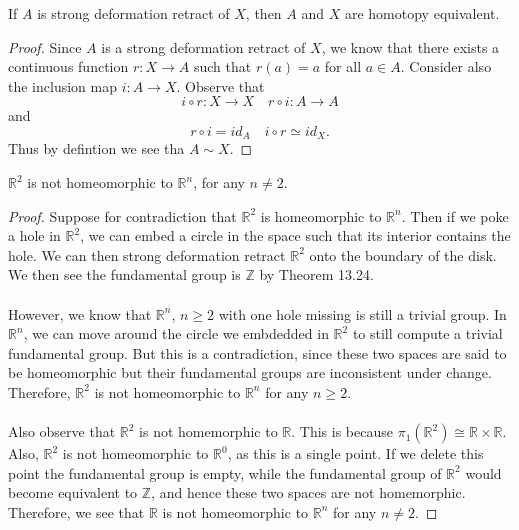 \documentclass[a4paper,12pt,twoside]{hmcpset}
\begin{document}
\begin{problem}[Lemma 13.26]
    If $A$ is strong deformation retract of $X$, then $A$ and $X$ are
    homotopy equivalent.
\end{problem}

\begin{proof}
    Since $A$ is a strong deformation retract of $X$, we know that
    there exists a continuous function $r: X \to A$ such that $r(a) =
    a$ for all $a \in A$. Consider also the inclusion map $i: A \to
    X$. Observe that 
    \[
        i \circ r : X \to X \quad  r \circ i: A \to A
    \]
    and 
    \[
        r \circ i = id_A \quad  i \circ r \simeq id_X.
    \]
    Thus by defintion we see tha $A \sim X$.
\end{proof}

\begin{problem}[Theorem 13.27]
    $\mathbb{R}^2$ is not homeomorphic to $\mathbb{R}^n$, for any $n
    \ne 2$.
\end{problem}

\begin{proof}
    Suppose for contradiction that $\mathbb{R}^2$ is homeomorphic to 
    $\mathbb{R}^n$. Then if we poke a hole in $\mathbb{R}^2$, we can
    embed a circle in the space such that its interior contains the
    hole. We can then strong deformation retract $\mathbb{R}^2$ onto
    the boundary of the disk. We then see the fundamental
    group is $\mathbb{Z}$ by Theorem 13.24. 
    \\
    \\
    However, we know that $\mathbb{R}^n$, $n \ge 2$ with one hole
    missing is still a trivial group. In $\mathbb{R}^n$, we can move
    around the circle we embdedded in $\mathbb{R}^2$ to still compute
    a trivial fundamental group. But this is a contradiction, since
    these two spaces are said to be homeomorphic but their fundamental
    groups are inconsistent under change. Therefore, $\mathbb{R}^2$ is
    not homeomorphic to $\mathbb{R}^n$ for any $n \ge 2$.
    \\
    \\
    Also observe that $\mathbb{R}^2$ is not homemorphic to
    $\mathbb{R}$. This is because $\pi_1(\mathbb{R}^2) \cong
    \mathbb{R} \times \mathbb{R}$. Also, $\mathbb{R}^2$ is not
    homeomorphic to $\mathbb{R}^{0}$, as this is a single point. If we
    delete this point the fundamental group is empty, while the
    fundamental group of $\mathbb{R}^2$ would become equivalent to
    $\mathbb{Z}$, and hence these two spaces are not homemorphic. 
    Therefore, we see that $\mathbb{R}$ is not homeomorphic to
    $\mathbb{R}^n$ for any $n \ne 2$.

\end{proof}
\end{document}
